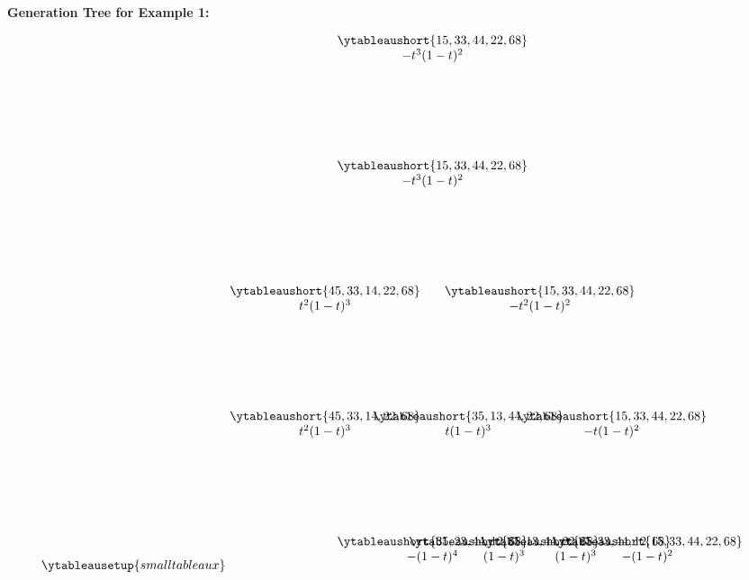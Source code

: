 \documentclass[11pt]{amsart}
\begin{document}
{\newpage
\textbf{Generation Tree for Example 1: }
\[
\ytableausetup{smalltableaux}
\begin{tikzpicture}[node distance=0cm]
\node(3)[yshift=-7cm]{$\begin{matrix}\ytableaushort{15,33,44,22,68}\\ -t^{3}(1-t)^{2}\end{matrix}$};
\node(4)[yshift=-10.5cm]{$\begin{matrix}\ytableaushort{15,33,44,22,68}\\ -t^{3}(1-t)^{2}\end{matrix}$};
\node(5)[yshift=-14cm,xshift=3cm]{$\begin{matrix}\ytableaushort{15,33,44,22,68}\\ -t^{2}(1-t)^{2}\end{matrix}$};
\node(6)[yshift=-14cm,xshift=-3cm]{$\begin{matrix}\ytableaushort{45,33,14,22,68}\\ t^{2}(1-t)^{3}\end{matrix}$};
\node(7)[yshift=-17.5cm,xshift=5cm]{$\begin{matrix}\ytableaushort{15,33,44,22,68}\\ -t(1-t)^{2}\end{matrix}$};
\node(8)[yshift=-17.5cm,xshift=1cm]{$\begin{matrix}\ytableaushort{35,13,44,22,68}\\ t(1-t)^{3}\end{matrix}$};
\node(9)[yshift=-17.5cm,xshift=-3cm]{$\begin{matrix}\ytableaushort{45,33,14,22,68}\\ t^{2}(1-t)^{3}\end{matrix}$};
\node(10)[yshift=-21cm,xshift=6cm]{$\begin{matrix}\ytableaushort{15,33,44,22,68}\\ -(1-t)^{2}\end{matrix}$};
\node(11)[yshift=-21cm,xshift=4cm]{$\begin{matrix}\ytableaushort{25,33,44,12,68}\\ (1-t)^{3}\end{matrix}$};
\node(12)[yshift=-21cm,xshift=2cm]{$\begin{matrix}\ytableaushort{35,13,44,22,68}\\ (1-t)^{3}\end{matrix}$};
\node(13)[yshift=-21cm]{$\begin{matrix}\ytableaushort{35,23,44,12,68}\\ -(1-t)^{4}\end{matrix}$};

\end{tikzpicture}\]}
\end{document}
